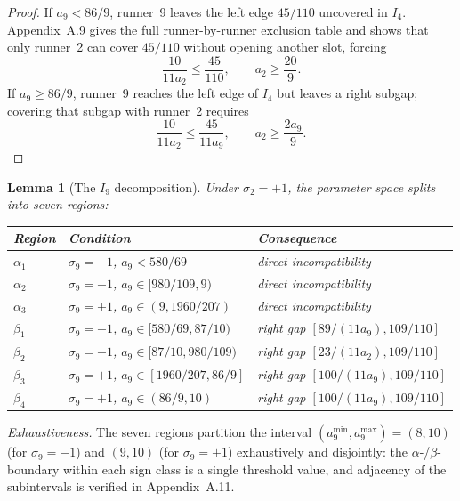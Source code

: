 \documentclass[12pt,a4paper]{amsart}
\newtheorem{lemma}[theorem]{Lemma}
\theoremstyle{definition}
\theoremstyle{remark}
\begin{document}
\begin{proof}
If $a_9<86/9$, runner~9 leaves the left edge $45/110$ uncovered in $I_4$.
Appendix~A.9 gives the full runner-by-runner exclusion table and shows that only runner~2
can cover $45/110$ without opening another slot, forcing
\[
  \frac{10}{11a_2} \le \frac{45}{110},\qquad a_2 \ge \frac{20}{9}.
\]
If $a_9\ge 86/9$, runner~9 reaches the left edge of $I_4$ but leaves a right subgap;
covering that subgap with runner~2 requires
\[
  \frac{10}{11a_2} \le \frac{45}{11a_9},\qquad a_2 \ge \frac{2a_9}{9}.
\]
\end{proof}

\begin{lemma}[The $I_9$ decomposition]\label{lem:i9decomp}
Under $\sigma_2=+1$, the parameter space splits into seven regions:

\medskip
\begin{center}
\begin{tabular}{llp{5cm}}
\toprule
Region & Condition & Consequence \\
\midrule
$\alpha_1$ & $\sigma_9=-1$, $a_9<580/69$ & direct incompatibility \\
$\alpha_2$ & $\sigma_9=-1$, $a_9\in[980/109,9)$ & direct incompatibility \\
$\alpha_3$ & $\sigma_9=+1$, $a_9\in(9,1960/207)$ & direct incompatibility \\
$\beta_1$  & $\sigma_9=-1$, $a_9\in[580/69,87/10)$ & right gap $[89/(11a_9),109/110]$ \\
$\beta_2$  & $\sigma_9=-1$, $a_9\in[87/10,980/109)$ & right gap $[23/(11a_2),109/110]$ \\
$\beta_3$  & $\sigma_9=+1$, $a_9\in[1960/207,86/9]$ & right gap $[100/(11a_9),109/110]$ \\
$\beta_4$  & $\sigma_9=+1$, $a_9\in(86/9,10)$ & right gap $[100/(11a_9),109/110]$ \\
\bottomrule
\end{tabular}
\end{center}
\end{lemma}

\noindent\textit{Exhaustiveness.} The seven regions partition the interval
$(a_9^{\min},a_9^{\max})=(8,10)$ (for $\sigma_9=-1$) and $(9,10)$ (for $\sigma_9=+1$)
exhaustively and disjointly: the $\alpha$-/$\beta$-boundary within each sign class is a
single threshold value, and adjacency of the subintervals is verified in Appendix~A.11.
\end{document}

